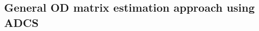 \documentclass[11pt,twoside]{article}
\numberwithin{equation}{section}
\newcommand{\?}{\stackrel{?}{=}}
\begin{document}

















\subsection{General OD matrix estimation approach using ADCS}





\end{document}
